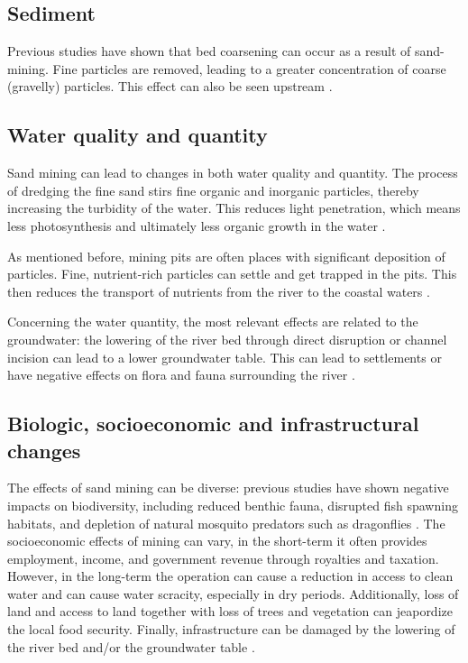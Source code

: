 \subsection{Sediment}
Previous studies have shown that bed coarsening can occur as a result of sand-mining. Fine particles are removed, leading to a greater concentration of coarse (gravelly) particles. This effect can also be seen upstream \autocite{sand-mining-boek}.

\subsection{Water quality and quantity}
Sand mining can lead to changes in both water quality and quantity. The process of dredging the fine sand stirs fine organic and inorganic particles, thereby increasing the turbidity of the water. This reduces light penetration, which means less photosynthesis and ultimately less organic growth in the water \autocite{sharipEffectsSeasonSand2014}.

As mentioned before, mining pits are often places with significant deposition of particles. Fine, nutrient-rich particles can settle and get trapped in the pits. This then reduces the transport of nutrients from the river to the coastal waters \autocite{sand-mining-boek}.

Concerning the water quantity, the most relevant effects are related to the groundwater: the lowering of the river bed through direct disruption or channel incision can lead to a lower groundwater table. This can lead to settlements or have negative effects on flora and fauna surrounding the river \autocite{rentierEnvironmentalImpactsRiver2022}.

\subsection{Biologic, socioeconomic and infrastructural changes}
The effects of sand mining can be diverse: previous studies have shown negative impacts on biodiversity, including reduced benthic fauna, disrupted fish spawning habitats, and depletion of natural mosquito predators such as dragonflies \autocite{sand-mining-boek}. The socioeconomic effects of mining can vary, in the short-term it often provides employment, income, and government revenue through royalties and taxation. However, in the long-term the operation can cause a reduction in access to clean water and can cause water scracity, especially in dry periods. Additionally, loss of land and access to land together with loss of trees and vegetation can jeapordize the local food security. Finally, infrastructure can be damaged by the lowering of the river bed and/or the groundwater table \autocite{sand-mining-boek}.














